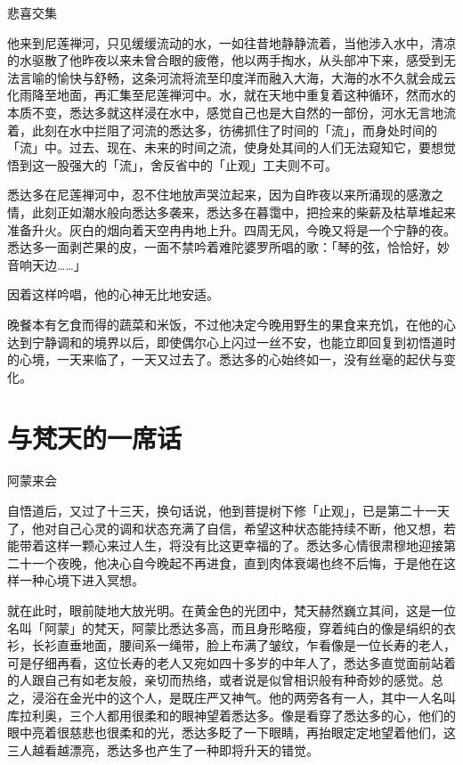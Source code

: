 \documentclass[12pt,twoside,openany]{book}
\begin{document}
悲喜交集

他来到尼莲禅河，只见缓缓流动的水，一如往昔地静静流着，当他涉入水中，清凉的水驱散了他昨夜以来未曾合眼的疲倦，他以两手掏水，从头部冲下来，感受到无法言喻的愉快与舒畅，这条河流将流至印度洋而融入大海，大海的水不久就会成云化雨降至地面，再汇集至尼莲禅河中。水，就在天地中重复着这种循环，然而水的本质不变，悉达多就这样浸在水中，感觉自己也是大自然的一部份，河水无言地流着，此刻在水中拦阻了河流的悉达多，彷彿抓住了时间的「流」，而身处时间的「流」中。过去、现在、未来的时间之流，使身处其间的人们无法窥知它，要想觉悟到这一股强大的「流」，舍反省中的「止观」工夫则不可。

悉达多在尼莲禅河中，忍不住地放声哭泣起来，因为自昨夜以来所涌现的感激之情，此刻正如潮水般向悉达多袭来，悉达多在暮霭中，把捡来的柴薪及枯草堆起来准备升火。灰白的烟向着天空冉冉地上升。四周无风，今晚又将是一个宁静的夜。悉达多一面剥芒果的皮，一面不禁吟着难陀婆罗所唱的歌：「琴的弦，恰恰好，妙音响天边……」

因着这样吟唱，他的心神无比地安适。

晚餐本有乞食而得的蔬菜和米饭，不过他决定今晚用野生的果食来充饥，在他的心达到宁静调和的境界以后，即使偶尔心上闪过一丝不安，也能立即回复到初悟道时的心境，一天来临了，一天又过去了。悉达多的心始终如一，没有丝毫的起伏与变化。

\section{与梵天的一席话}\label{sec1.17}

阿蒙来会

自悟道后，又过了十三天，换句话说，他到菩提树下修「止观」，已是第二十一天了，他对自己心灵的调和状态充满了自信，希望这种状态能持续不断，他又想，若能带着这样一颗心来过人生，将没有比这更幸福的了。悉达多心情很肃穆地迎接第二十一个夜晚，他决心自今晚起不再进食，直到肉体衰竭也终不后悔，于是他在这样一种心境下进入冥想。

就在此时，眼前陡地大放光明。在黄金色的光团中，梵天赫然巍立其间，这是一位名叫「阿蒙」的梵天，阿蒙比悉达多高，而且身形略瘦，穿着纯白的像是绢织的衣衫，长衫直垂地面，腰间系一绳带，脸上布满了皱纹，乍看像是一位长寿的老人，可是仔细再看，这位长寿的老人又宛如四十多岁的中年人了，悉达多直觉面前站着的人跟自己有如老友般，亲切而热络，或者说是似曾相识般有种奇妙的感觉。总之，浸浴在金光中的这个人，是既庄严又神气。他的两旁各有一人，其中一人名叫库拉利奥，三个人都用很柔和的眼神望着悉达多。像是看穿了悉达多的心，他们的眼中亮着很慈悲也很柔和的光，悉达多眨了一下眼睛，再抬眼定定地望着他们，这三人越看越漂亮，悉达多也产生了一种即将升天的错觉。
\end{document}
